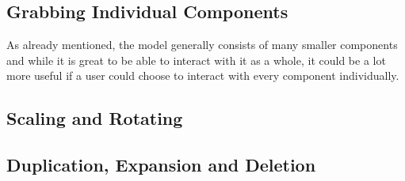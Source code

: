 \subsection{Grabbing Individual Components}

As already mentioned, the model generally consists of many smaller components and while it is great to be able to interact with it as a whole, it could be a lot more useful if a user could choose to interact with every component individually.

\subsection{Scaling and Rotating}

\subsection{Duplication, Expansion and Deletion}



